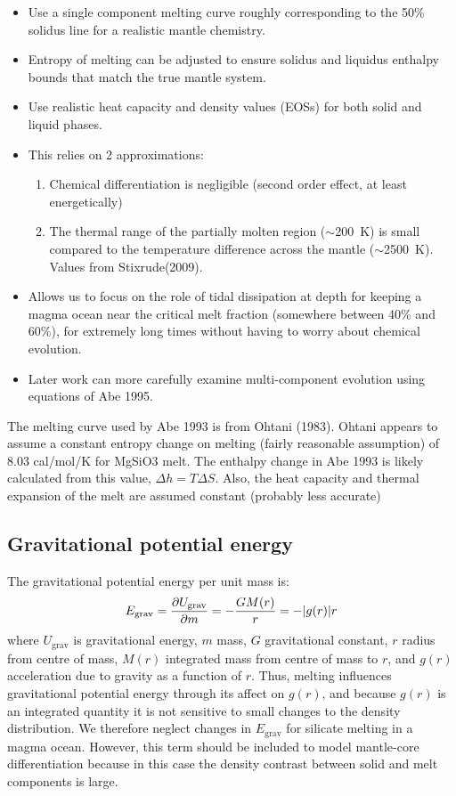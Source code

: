 \begin{itemize}
  \item Use a single component melting curve roughly corresponding to the 50\% solidus line for a realistic mantle chemistry. 
  \item Entropy of melting can be adjusted to ensure solidus and liquidus enthalpy bounds that match the true mantle system. 
  \item Use realistic heat capacity and density values (EOSs) for both solid and liquid phases. 
  \item This relies on 2 approximations: 
    \begin{enumerate}
      \item Chemical differentiation is negligible (second order effect, at least energetically)
      \item The thermal range of the partially molten region ($\sim$200~K) is small compared to the temperature difference across the mantle ($\sim$2500~K). Values from Stixrude(2009).
    \end{enumerate}
  \item Allows us to focus on the role of tidal dissipation at depth for keeping a magma ocean near the critical melt fraction (somewhere between 40\% and 60\%), for extremely long times without having to worry about chemical evolution. 
  \item Later work can more carefully examine multi-component evolution using equations of Abe 1995.
\end{itemize}

The melting curve used by Abe 1993 is from Ohtani (1983).
Ohtani appears to assume a constant entropy change on melting (fairly reasonable assumption) of 8.03 cal/mol/K for MgSiO3 melt.
The enthalpy change in Abe 1993 is likely calculated from this value, $\Delta h = T \Delta S$.
Also, the heat capacity and thermal expansion of the melt are assumed constant (probably less accurate)

\subsection{Gravitational potential energy}
The gravitational potential energy per unit mass is:
\begin{equation}
E_{\rm grav} = \frac{\partial U_{\rm grav}}{\partial m} = - \frac{G M(r)}{r} = - |g(r)|r
\end{equation}
where $U_{\mathrm{grav}}$ is gravitational energy, $m$ mass, $G$ gravitational constant, $r$ radius from centre of mass, $M(r)$ integrated mass from centre of mass to $r$, and $g(r)$ acceleration due to gravity as a function of $r$.
Thus, melting influences gravitational potential energy through its affect on $g(r)$, and because $g(r)$ is an integrated quantity it is not sensitive to small changes to the density distribution.  We therefore neglect changes in $E_{\mathrm{grav}}$ for silicate melting in a magma ocean.  However, this term should be included to model mantle-core differentiation because in this case the density contrast between solid and melt components is large.
